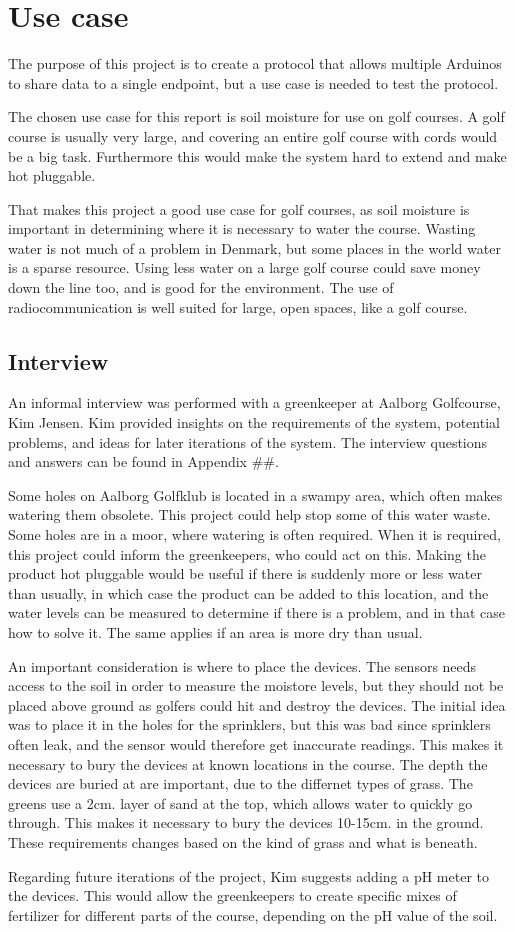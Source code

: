 \chapter{Use case}
The purpose of this project is to create a protocol that allows multiple Arduinos to share data to a single endpoint, but a use case is needed to test the protocol.

The chosen use case for this report is soil moisture for use on golf courses. A golf course is usually very large, and covering an entire golf course with cords would be a big task. Furthermore this would make the system hard to extend and make hot pluggable.

That makes this project a good use case for golf courses, as soil moisture is important in determining where it is necessary to water the course. Wasting water is not much of a problem in Denmark, but some places in the world water is a sparse resource. Using less water on a large golf course could save money down the line too, and is good for the environment. The use of radiocommunication is well suited for large, open spaces, like a golf course.

\section{Interview}
An informal interview was performed with a greenkeeper at Aalborg Golfcourse, Kim Jensen. Kim provided insights on the requirements of the system, potential problems, and ideas for later iterations of the system. The interview questions and answers can be found in Appendix \#\#. 

Some holes on Aalborg Golfklub is located in a swampy area, which often makes watering them obsolete. This project could help stop some of this water waste. Some holes are in a moor, where watering is often required. When it is required, this project could inform the greenkeepers, who could act on this.
Making the product hot pluggable would be useful if there is suddenly more or less water than usually, in which case the product can be added to this location, and the water levels can be measured to determine if there is a problem, and in that case how to solve it. The same applies if an area is more dry than usual.

An important consideration is where to place the devices. The sensors needs access to the soil in order to measure the moistore levels, but they should not be placed above ground as golfers could hit and destroy the devices. The initial idea was to place it in the holes for the sprinklers, but this was bad since sprinklers often leak, and the sensor would therefore get inaccurate readings.
This makes it necessary to bury the devices at known locations in the course. The depth the devices are buried at are important, due to the differnet types of grass. The greens use a 2cm. layer of sand at the top, which allows water to quickly go through. This makes it necessary to bury the devices 10-15cm. in the ground. These requirements changes based on the kind of grass and what is beneath.

Regarding future iterations of the project, Kim suggests adding a pH meter to the devices. This would allow the greenkeepers to create specific mixes of fertilizer for different parts of the course, depending on the pH value of the soil. 